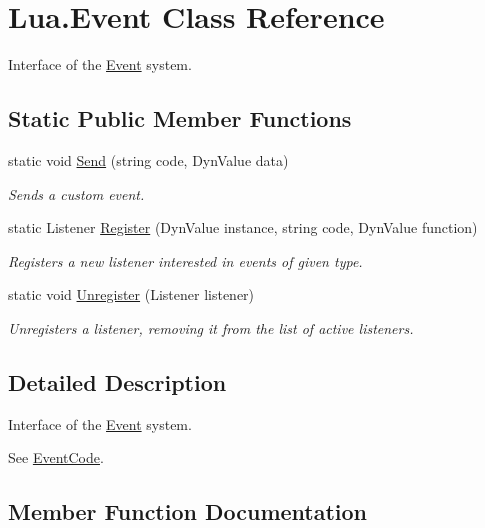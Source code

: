 \hypertarget{class_lua_1_1_event}{}\section{Lua.\+Event Class Reference}
\label{class_lua_1_1_event}


Interface of the \mbox{\hyperlink{class_lua_1_1_event}{Event}} system.  


\subsection*{Static Public Member Functions}
\begin{DoxyCompactItemize}
\item 
static void \mbox{\hyperlink{class_lua_1_1_event_a4f4b7c37fb65d1ee54fd1acbf0c9a62a}{Send}} (string code, Dyn\+Value data)
\begin{DoxyCompactList}\small\item\em Sends a custom event. \end{DoxyCompactList}\item 
static Listener \mbox{\hyperlink{class_lua_1_1_event_a439c6db49f39ede1ac95b7863b3a3f9a}{Register}} (Dyn\+Value instance, string code, Dyn\+Value function)
\begin{DoxyCompactList}\small\item\em Registers a new listener interested in events of given type. \end{DoxyCompactList}\item 
static void \mbox{\hyperlink{class_lua_1_1_event_a9b74e2fbd70a5168d210ac326f6ca032}{Unregister}} (Listener listener)
\begin{DoxyCompactList}\small\item\em Unregisters a listener, removing it from the list of active listeners. \end{DoxyCompactList}\end{DoxyCompactItemize}


\subsection{Detailed Description}
Interface of the \mbox{\hyperlink{class_lua_1_1_event}{Event}} system. 

See \mbox{\hyperlink{class_event_code}{Event\+Code}}. 

\subsection{Member Function Documentation}
\mbox{\label{class_lua_1_1_event_a439c6db49f39ede1ac95b7863b3a3f9a}} 
